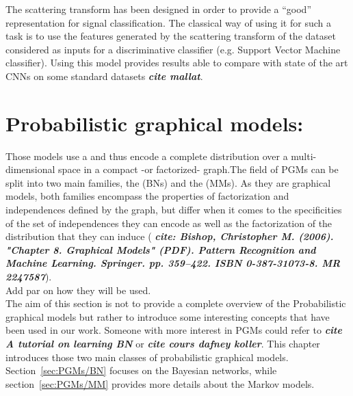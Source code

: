 \documentclass[a4paper,11pt]{report}
\begin{document}
    The scattering transform has been designed in order to provide a ``good'' representation for signal classification. The classical way of using it for such a task is to use the features generated by the scattering transform of the dataset considered as inputs for a discriminative classifier (e.g. Support Vector Machine classifier). Using this model provides results able to compare with state of the art CNNs on some standard datasets \textbf{\textit{cite mallat}}. \\

    
    
\chapter{Probabilistic graphical models:}
  \label{chap:PGMs}
  
  Those models use a  and thus encode a complete distribution over a multi-dimensional space in a compact -or factorized- graph.The field of PGMs can be split into two main families, the  (BNs) and the  (MMs). As they are graphical models, both families encompass the properties of factorization and independences defined by the graph, but differ when it comes to the specificities of the set of independences they can encode as well as the factorization of the distribution that they can induce (  \textbf{\textit{cite: Bishop, Christopher M. (2006). "Chapter 8. Graphical Models" (PDF). Pattern Recognition and Machine Learning. Springer. pp. 359–422. ISBN 0-387-31073-8. MR 2247587}}).\\
  
  Add par on how they will be used.\\ %
  
  The aim of this section is not to provide a complete overview of the Probabilistic graphical models but rather to introduce some interesting concepts that have been used in our work. Someone with more interest in PGMs could refer to \textbf{\textit{cite A tutorial on learning BN}} or \textbf{\textit{cite cours dafney koller}}. 
  This chapter introduces those two main classes of probabilistic graphical models. Section~\ref{sec:PGMs/BN} focuses on the Bayesian networks, while section~\ref{sec:PGMs/MM} provides more details about the Markov models.
	
\end{document}
